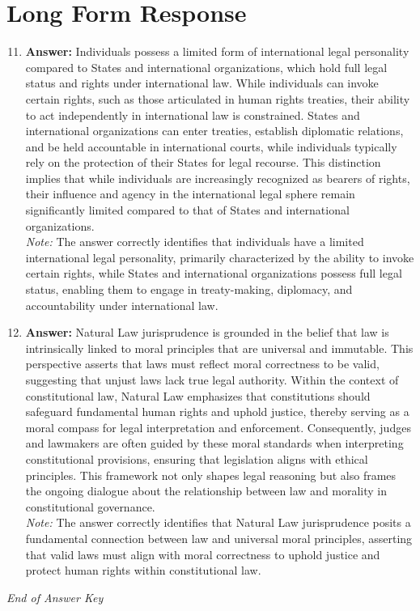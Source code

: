 \documentclass[12pt]{article}
\begin{document}
\section*{Long Form Response}
\begin{enumerate}[label=\arabic*.]
\setcounter{enumi}{10}
\item \textbf{Answer:} Individuals possess a limited form of international legal personality compared to States and international organizations, which hold full legal status and rights under international law. While individuals can invoke certain rights, such as those articulated in human rights treaties, their ability to act independently in international law is constrained. States and international organizations can enter treaties, establish diplomatic relations, and be held accountable in international courts, while individuals typically rely on the protection of their States for legal recourse. This distinction implies that while individuals are increasingly recognized as bearers of rights, their influence and agency in the international legal sphere remain significantly limited compared to that of States and international organizations.
\\ \textit{Note:} The answer correctly identifies that individuals have a limited international legal personality, primarily characterized by the ability to invoke certain rights, while States and international organizations possess full legal status, enabling them to engage in treaty-making, diplomacy, and accountability under international law.
\item \textbf{Answer:} Natural Law jurisprudence is grounded in the belief that law is intrinsically linked to moral principles that are universal and immutable. This perspective asserts that laws must reflect moral correctness to be valid, suggesting that unjust laws lack true legal authority. Within the context of constitutional law, Natural Law emphasizes that constitutions should safeguard fundamental human rights and uphold justice, thereby serving as a moral compass for legal interpretation and enforcement. Consequently, judges and lawmakers are often guided by these moral standards when interpreting constitutional provisions, ensuring that legislation aligns with ethical principles. This framework not only shapes legal reasoning but also frames the ongoing dialogue about the relationship between law and morality in constitutional governance.
\\ \textit{Note:} The answer correctly identifies that Natural Law jurisprudence posits a fundamental connection between law and universal moral principles, asserting that valid laws must align with moral correctness to uphold justice and protect human rights within constitutional law.
\end{enumerate}

\vfill
\noindent\textit{End of Answer Key}
\end{document}
